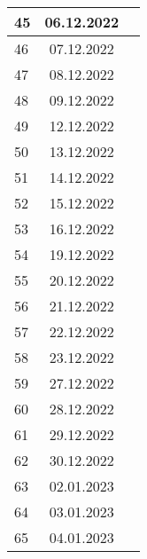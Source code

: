 \begin{longtable}{|l|c|l|}
45  & 06.12.2022    &                                                       \\ \hline   
46  & 07.12.2022    &                                                       \\ \hline 
47  & 08.12.2022    &                                                       \\ \hline 
48  & 09.12.2022    &                                                       \\ \hline 
49  & 12.12.2022    &                                                       \\ \hline 
50  & 13.12.2022    &                                                       \\ \hline 
51  & 14.12.2022    &                                                       \\ \hline 
52  & 15.12.2022    &                                                       \\ \hline 
53  & 16.12.2022    &                                                       \\ \hline 
54  & 19.12.2022    &                                                       \\ \hline 
55  & 20.12.2022    &                                                       \\ \hline 
56  & 21.12.2022    &                                                       \\ \hline 
57  & 22.12.2022    &                                                       \\ \hline 
58  & 23.12.2022    &                                                       \\ \hline 
59  & 27.12.2022    &                                                       \\ \hline 
60  & 28.12.2022    &                                                       \\ \hline 
61  & 29.12.2022    &                                                       \\ \hline 
62  & 30.12.2022    &                                                       \\ \hline 
63  & 02.01.2023    &                                                       \\ \hline 
64  & 03.01.2023    &                                                       \\ \hline 
65  & 04.01.2023    &                                                       \\ \hline 

\end{longtable}
